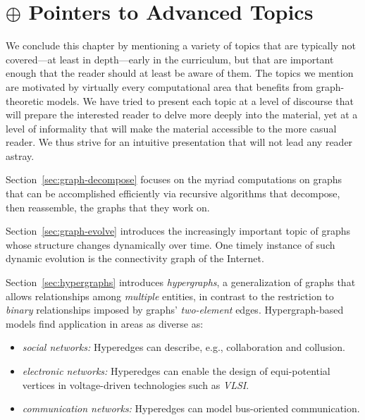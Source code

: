 
\section{$\oplus$ Pointers to Advanced Topics}
\label{sec:advanced-topics}


We conclude this chapter by mentioning a variety of topics that are typically not covered---at least in depth---early in the curriculum, but that are important enough that the reader should at least be aware of them.  The topics we mention are motivated by virtually every computational area that benefits from graph-theoretic models.  We have tried to present each topic at a level of discourse that will prepare the interested reader to delve more deeply into the material, yet at a level of informality that will make the material accessible to the more casual reader.  We thus strive for an intuitive presentation that will not lead any reader astray.



Section~\ref{sec:graph-decompose} focuses on the myriad computations on graphs that can be accomplished efficiently via recursive algorithms that decompose, then reassemble, the graphs that they work on.

Section~\ref{sec:graph-evolve}  introduces the increasingly important topic of graphs whose structure changes dynamically over time.  One timely instance of such dynamic evolution is the connectivity graph of the Internet.

 

Section~\ref{sec:hypergraphs} introduces {\it hypergraphs}, a generalization of graphs that allows relationships among {\em multiple} entities, in contrast to the restriction to {\em binary} relationships imposed by graphs' {\em two-element} edges.  Hypergraph-based models find application in areas as diverse as:
\begin{itemize}
\item
{\it social networks:} Hyperedges can describe, e.g., collaboration and collusion.
\item
{\it electronic networks:} Hyperedges can enable the design of equi-potential vertices in 
voltage-driven technologies such as {\it VLSI}.
\item
{\it communication networks:} Hyperedges can model bus-oriented communication.
\end{itemize}

